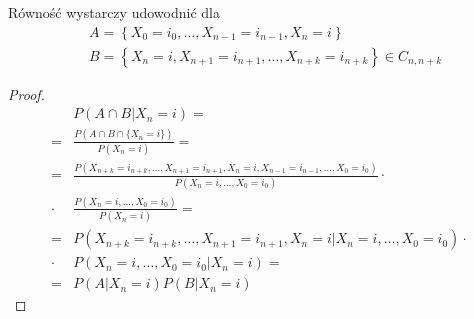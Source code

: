 Równość wystarczy udowodnić dla 
\begin{align*}
&A=\left\{X_0=i_0,\dots,X_{n-1}=i_{n-1},X_n=i\right\}\\
&B=\left\{X_n=i,X_{n+1}=i_{n+1},\dots,X_{n+k}=i_{n+k}\right\}\in C_{n,n+k}
\end{align*}
\begin{proof}
\begin{align*}
&P\left(A\cap B|X_n=i\right)
=\\=&
\frac{P\left(A\cap B\cap\{X_n=i\}\right)}{P\left(X_n=i\right)}
=\\=&
\frac{P\left(X_{n+k}=i_{n+k},\dots,X_{n+1}=i_{n+1},X_n=i,X_{n-1}=i_{n-1},\dots,X_0=i_0\right)}{P\left(X_n=i,\dots,X_0=i_0\right)}
\cdot\\\cdot&
\frac{P\left(X_n=i,\dots,X_0=i_0\right)}{P\left(X_n=i\right)}
=\\=&
P\left(X_{n+k}=i_{n+k},\dots,X_{n+1}=i_{n+1},X_n=i|X_n=i,\dots,X_0=i_0\right)
\cdot\\\cdot&
P\left(X_n=i,\dots,X_0=i_0|X_n=i\right)
=\\=&
P\left(A|X_n=i\right)
P\left(B|X_n=i\right)
\end{align*}
\end{proof}

